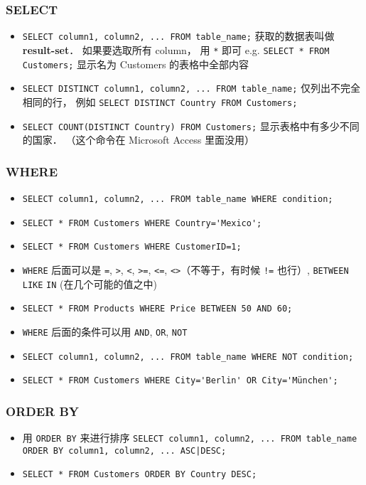 \subsubsection{SELECT}
\begin{itemize}
\item \verb`SELECT column1, column2, ... FROM table_name;` 获取的数据表叫做 \textbf{result-set}． 如果要选取所有 column， 用 \verb`*` 即可 e.g. \verb`SELECT * FROM Customers;` 显示名为 Customers 的表格中全部内容
\item \verb`SELECT DISTINCT column1, column2, ... FROM table_name;` 仅列出不完全相同的行， 例如 \verb`SELECT DISTINCT Country FROM Customers;`
\item \verb`SELECT COUNT(DISTINCT Country) FROM Customers;` 显示表格中有多少不同的国家． （这个命令在 Microsoft Access 里面没用）
\end{itemize}

\subsubsection{WHERE}
\begin{itemize}
\item \verb`SELECT column1, column2, ... FROM table_name WHERE condition;`
\item \verb`SELECT * FROM Customers WHERE Country='Mexico';`
\item \verb`SELECT * FROM Customers WHERE CustomerID=1;`
\item \verb`WHERE` 后面可以是 \verb`=`, \verb`>`, \verb`<`, \verb`>=`, \verb`<=`, \verb`<>`（不等于，有时候 \verb`!=` 也行）, \verb`BETWEEN` \verb`LIKE` \verb`IN` (在几个可能的值之中)
\item \verb`SELECT * FROM Products WHERE Price BETWEEN 50 AND 60;`
\item \verb`WHERE` 后面的条件可以用 \verb`AND`, \verb`OR`, \verb`NOT`
\item \verb`SELECT column1, column2, ... FROM table_name WHERE NOT condition;`
\item \verb`SELECT * FROM Customers WHERE City='Berlin' OR City='München';`
\end{itemize}

\subsubsection{ORDER BY}
\begin{itemize}
\item 用 \verb`ORDER BY` 来进行排序 \verb`SELECT column1, column2, ... FROM table_name ORDER BY column1, column2, ... ASC|DESC;`
\item \verb`SELECT * FROM Customers ORDER BY Country DESC;`
\end{itemize}

